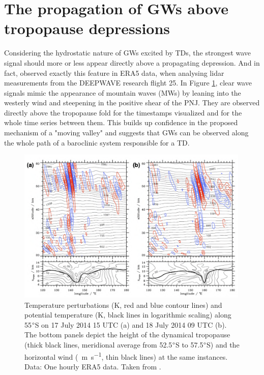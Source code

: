 \section{The propagation of GWs above tropopause depressions}
\label{sec:propagation}
Considering the hydrostatic nature of GWs excited by TDs, the strongest wave signal should more or less appear directly above a propagating depression. And in fact, \textcite{dornbrack_stratospheric_2022} observed exactly this feature in ERA5 data, when analysing lidar measurements from the DEEPWAVE research flight 25. In Figure \ref{fig:RF25_era5_vertical}, clear wave signals mimic the appearance of mountain waves (MWs) by leaning into the westerly wind and steepening in the positive shear of the PNJ. They are observed directly above the tropopause fold for the timestamps visualized and for the whole time series between them. This builds up confidence in the proposed mechanism of a "moving valley" and suggests that GWs can be observed along the whole path of a baroclinic system responsible for a TD. \\
%
\begin{figure}[t]
    \centering
    \includegraphics[width=0.99\textwidth]{figures_intro/RF25_ERA5_vertical.png}
    \caption{Temperature perturbations (K, red and blue contour lines) and potential temperature (K, black lines in logarithmic scaling) along 55$\degree$S on 17 July 2014 15 UTC (a) and 18 July 2014 09 UTC (b). The bottom panels depict the height of the dynamical tropopause (thick black lines, meridional average from 52.5$\degree$S to 57.5$\degree$S) and the horizontal wind (\SI{}{\meter\second^{-1}}, thin black lines) at the same instances. Data: One hourly ERA5 data. Taken from \textcite[]{dornbrack_stratospheric_2022}.}
    \label{fig:RF25_era5_vertical}
\end{figure}
